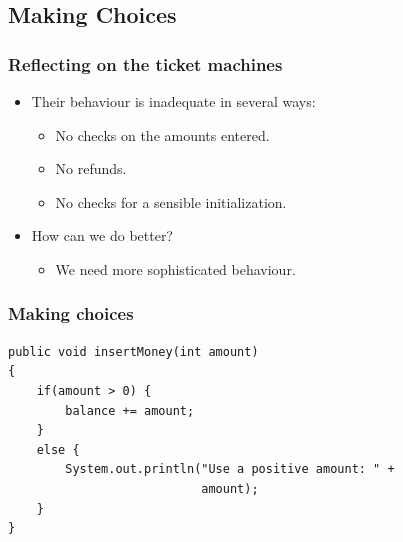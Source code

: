 \subsection{Making Choices}

\begin{frame}
\frametitle{Reflecting on the ticket machines}
\begin{itemize}
\item Their behaviour is inadequate in several ways:
\begin{itemize}
\item No checks on the amounts entered.
\item No refunds.
\item No checks for a sensible initialization.
\end{itemize}
\item How can we do better?
\begin{itemize}
\item We need more sophisticated behaviour.
\end{itemize}
\end{itemize}
\end{frame}

\begin{frame}[fragile]
\frametitle{Making choices}
\codelist
\begin{lstlisting}
public void insertMoney(int amount)‏
{
    if(amount > 0) {
        balance += amount;
    }
    else {
        System.out.println("Use a positive amount: " +
                           amount);
    }
}
\end{lstlisting}
\end{frame} 


